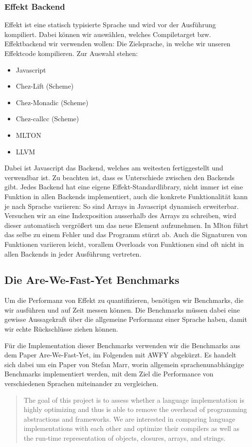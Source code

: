 \subsubsection{ Effekt Backend }
Effekt ist eine statisch typisierte Sprache und wird vor der Ausführung kompiliert.
Dabei können wir auswählen, welches Compiletarget bzw. Effektbackend wir verwenden wollen: Die Zielsprache, in welche wir unseren Effektcode kompilieren.
Zur Auswahl stehen:
\begin{itemize}
    \item Javascript
    \item Chez-Lift (Scheme)
    \item Chez-Monadic (Scheme)
    \item Chez-callcc (Scheme)
    \item MLTON
    \item LLVM
\end{itemize}
Dabei ist Javascript das Backend, welches am weitesten fertiggestellt und verwendbar ist. 
Zu beachten ist, dass es Unterschiede zwischen den Backends gibt.
Jedes Backend hat eine eigene Effekt-Standardlibrary, nicht immer ist eine Funktion in allen Backends implementiert, auch die konkrete Funktionalität kann je nach Sprache variieren:
So sind Arrays in Javascript dynamisch erweiterbar. Versuchen wir an eine Indexposition ausserhalb des Arrays zu schreiben, wird dieser automatisch vergrößert um das neue Element aufzunehmen.
In Mlton führt das selbe zu einem Fehler und das Programm stürzt ab.
Auch die Signaturen von Funktionen variieren leicht, vorallem Overloads von Funktionen sind oft nicht in allen Backends in jeder Ausführung vertreten.

\subsection{ Die Are-We-Fast-Yet Benchmarks }
Um die Performanz von Effekt zu quantifizieren, benötigen wir Benchmarks, die wir ausführen und auf Zeit messen können. Die Benchmarks müssen dabei eine gewisse Aussagekraft über die allgemeine Performanz einer Sprache haben, damit wir echte Rückschlüsse ziehen können.

Für die Implementation dieser Benchmarks verwenden wir die Benchmarks aus dem Paper Are-We-Fast-Yet, im Folgenden mit AWFY abgekürzt.
Es handelt sich dabei um ein Paper von Stefan Marr, worin allgemein sprachenunabhängige Benchmarks implementiert werden, mit dem Ziel die Performance von verschiedenen Sprachen miteinander zu vergleichen.
\begin{center}
    \begin{quote}
        The goal of this project is to assess whether a language implementation is highly optimizing and thus is able to remove the overhead of programming abstractions and frameworks. We are interested in comparing language implementations with each other and optimize their compilers as well as the run-time representation of objects, closures, arrays, and strings.
    \end{quote}
\end{center}

